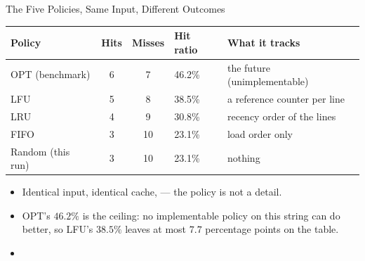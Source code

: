\documentclass[aspectratio=169]{beamer}
\begin{document}
\begin{frame}{The Five Policies, Same Input, Different Outcomes}
  \footnotesize
  \begin{center}
  \begin{tabular}{@{}lccll@{}}
    \toprule
    \textbf{Policy} & \textbf{Hits} & \textbf{Misses} & \textbf{Hit ratio} & \textbf{What it tracks} \\
    \midrule
    OPT (benchmark)     & 6 & 7  & 46.2\% & the future (unimplementable) \\
    LFU                 & 5 & 8  & 38.5\% & a reference counter per line \\
    LRU                 & 4 & 9  & 30.8\% & recency order of the lines \\
    FIFO                & 3 & 10 & 23.1\% & load order only \\
    Random (this run)   & 3 & 10 & 23.1\% & nothing \\
    \bottomrule
  \end{tabular}
  \end{center}
  \vspace{0.3cm}
  \normalsize
  \begin{itemize}
    \item Identical input, identical cache,  --- the policy is not a detail.
    \item OPT's $46.2\%$ is the ceiling: no implementable policy on this string
      can do better, so LFU's $38.5\%$ leaves at most $7.7$ percentage points
      on the table.
    \item {}
  \end{itemize}
\end{frame}
\end{document}
